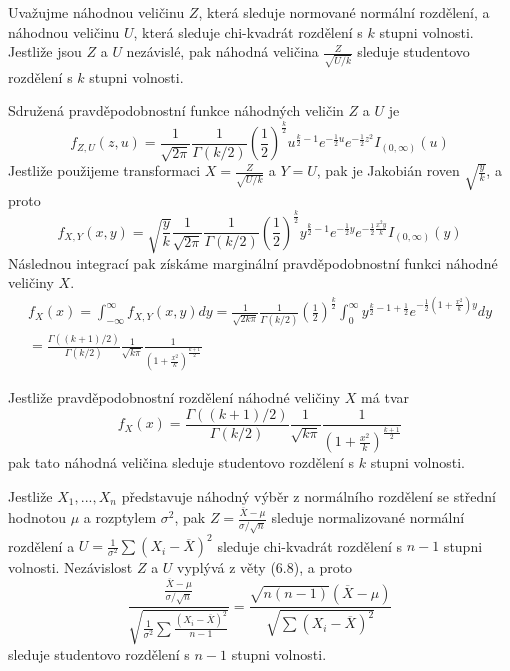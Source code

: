\begin{theorem}
Uvažujme náhodnou veličinu $Z$, která sleduje normované normální rozdělení, a náhodnou veličinu $U$, která sleduje chi-kvadrát rozdělení s $k$ stupni volnosti. Jestliže jsou $Z$ a $U$ nezávislé, pak náhodná veličina $\frac{Z}{\sqrt{U/k}}$ sleduje studentovo rozdělení s $k$ stupni volnosti.
\end{theorem}

Sdružená pravděpodobnostní funkce náhodných veličin $Z$ a $U$ je
\begin{equation*}
f_{Z,U}(z,u) = \frac{1}{\sqrt{2 \pi}} \frac{1}{\Gamma(k/2)} \left( \frac{1}{2} \right)^{\frac{k}{2}}u^{\frac{k}{2} - 1}e^{-\frac{1}{2}u}e^{-\frac{1}{2}z^2}I_{(0, \infty)}(u)
\end{equation*}
Jestliže použijeme transformaci $X = \frac{Z}{\sqrt{U/k}}$ a $Y = U$, pak je Jakobián roven $\sqrt{\frac{y}{k}}$, a proto
\begin{equation*}
f_{X,Y}(x,y) = \sqrt{\frac{y}{k}}\frac{1}{\sqrt{2 \pi}}\frac{1}{\Gamma(k/2)}\left(\frac{1}{2}\right)^{\frac{k}{2}}y^{\frac{k}{2} - 1}e^{-\frac{1}{2}y}e^{-\frac{1}{2}\frac{x^2y}{k}}I_{(0, \infty)}(y)
\end{equation*}
Následnou integrací pak získáme marginální pravděpodobnostní funkci náhodné veličiny $X$.
\begin{gather*}
f_X(x) = \int_{-\infty}^{\infty} f_{X,Y}(x,y)dy = \frac{1}{\sqrt{2 k \pi}} \frac{1}{\Gamma(k/2)} \left(\frac{1}{2} \right)^{\frac{k}{2}} \int_0^{\infty}y^{\frac{k}{2} - 1 + \frac{1}{2}}e^{-\frac{1}{2}\left(1 + \frac{x^2}{k}\right)y}dy\\
= \frac{\Gamma \left((k + 1)/2\right)}{\Gamma(k/2)} \frac{1}{\sqrt{k \pi}} \frac{1}{\left(1 + \frac{x^2}{k} \right)^{\frac{k + 1}{2}}}
\end{gather*}

\begin{definition}
Jestliže pravděpodobnostní rozdělení náhodné veličiny $X$ má tvar
\begin{equation*}
 f_X(x) = \frac{\Gamma \left((k + 1)/2\right)}{\Gamma(k/2)} \frac{1}{\sqrt{k \pi}} \frac{1}{\left(1 + \frac{x^2}{k} \right)^{\frac{k + 1}{2}}}
\end{equation*}
pak tato náhodná veličina sleduje studentovo rozdělení s $k$ stupni volnosti.
\end{definition}

\begin{corollary}
Jestliže $X_1, ..., X_n$ představuje náhodný výběr z normálního rozdělení se střední hodnotou $\mu$ a rozptylem $\sigma^2$, pak $Z = \frac{\overline{X} - \mu}{\sigma / \sqrt{n}}$ sleduje normalizované normální rozdělení a $U = \frac{1}{\sigma^2} \sum (X_i - \overline{X})^2$ sleduje chi-kvadrát rozdělení s $n - 1$ stupni volnosti. Nezávislost $Z$ a $U$ vyplývá z věty (6.8), a proto
\begin{equation*}
\frac{\frac{\overline{X} - \mu}{\sigma / \sqrt{n}}}{\sqrt{\frac{1}{\sigma^2} \sum \frac{(X_i - \overline{X})^2}{n - 1}}} = \frac{\sqrt{n(n - 1)}(\overline{X} - \mu)}{\sqrt{\sum (X_i - \overline{X})^2}}
\end{equation*}
sleduje studentovo rozdělení s $n - 1$ stupni volnosti.
\end{corollary}

